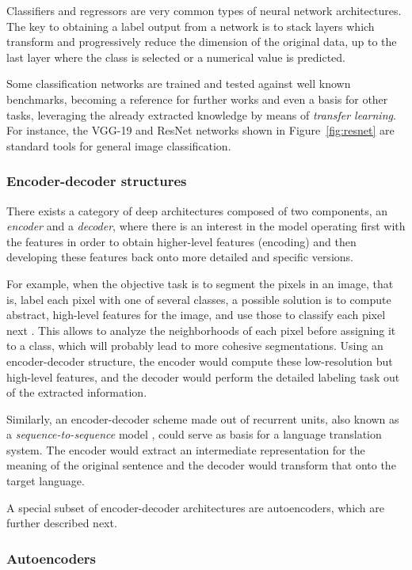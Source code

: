 Classifiers and regressors are very common types of neural network architectures. The key to obtaining a label output from a network is to stack layers which transform and progressively reduce the dimension of the original data, up to the last layer where the class is selected or a numerical value is predicted. 

Some classification networks are trained and tested against well known benchmarks, becoming a reference for further works and even a basis for other tasks, leveraging the already extracted knowledge by means of \textit{transfer learning}. For instance, the VGG-19 and ResNet networks shown in Figure~\ref{fig:resnet} are standard tools for general image classification.

\subsubsection{Encoder-decoder structures}

There exists a category of deep architectures composed of two components, an \textit{encoder} and a \textit{decoder}, where there is an interest in the model operating first with the features in order to obtain higher-level features (encoding) and then developing these features back onto more detailed and specific versions.

For example, when the objective task is to segment the pixels in an image, that is, label each pixel with one of several classes, a possible solution is to compute abstract, high-level features for the image, and use those to classify each pixel next . This allows to analyze the neighborhoods of each pixel before assigning it to a class, which will probably lead to more cohesive segmentations. Using an encoder-decoder structure, the encoder would compute these low-resolution but high-level features, and the decoder would perform the detailed labeling task out of the extracted information.

Similarly, an encoder-decoder scheme made out of recurrent units, also known as a \textit{sequence-to-sequence} model , could serve as basis for a language translation system. The encoder would extract an intermediate representation for the meaning of the original sentence and the decoder would transform that onto the target language.

A special subset of encoder-decoder architectures are autoencoders, which are further described next.

\subsubsection{Autoencoders}


